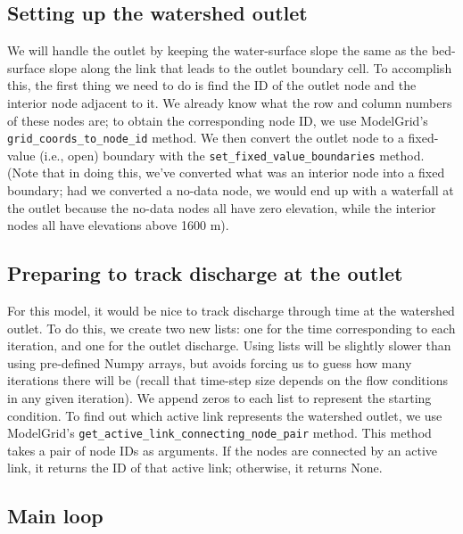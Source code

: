 \documentclass[12pt]{article}
\newcommand{\code}[1]{{\tt #1}}
\begin{document}
\subsection{Setting up the watershed outlet}



We will handle the outlet by keeping the water-surface slope the same as the bed-surface slope along the link that leads to the outlet boundary cell. To accomplish this, the first thing we need to do is find the ID of the outlet node and the interior node adjacent to it. We already know what the row and column numbers of these nodes are; to obtain the corresponding node ID, we use ModelGrid's \code{grid\_coords\_to\_node\_id} method. We then convert the outlet node to a fixed-value (i.e., open) boundary with the \code{set\_fixed\_value\_boundaries} method. (Note that in doing this, we've converted what was an interior node into a fixed boundary; had we converted a no-data node, we would end up with a waterfall at the outlet because the no-data nodes all have zero elevation, while the interior nodes all have elevations above 1600 m).

\subsection{Preparing to track discharge at the outlet}



For this model, it would be nice to track discharge through time at the watershed outlet. To do this, we create two new lists: one for the time corresponding to each iteration, and one for the outlet discharge. Using lists will be slightly slower than using pre-defined Numpy arrays, but avoids forcing us to guess how many iterations there will be (recall that time-step size depends on the flow conditions in any given iteration). We append zeros to each list to represent the starting condition. To find out which active link represents the watershed outlet, we use ModelGrid's \code{get\_active\_link\_connecting\_node\_pair} method. This method takes a pair of node IDs as arguments. If the nodes are connected by an active link, it returns the ID of that active link; otherwise, it returns None.

\subsection{Main loop}
\end{document}
